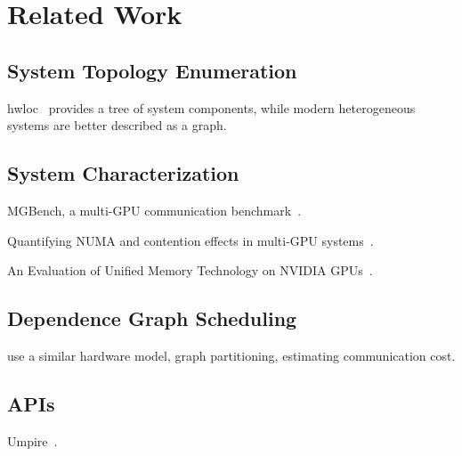 \chapter{Related Work}
\label{ch:related}


\section{System Topology Enumeration}

hwloc~\cite{broquedis2010hwloc} provides a tree of system components, while modern heterogeneous systems are better described as a graph.


\section{System Characterization}

MGBench, a multi-GPU communication benchmark~\cite{bennun2016mgbench}.

Quantifying NUMA and contention effects in multi-GPU systems~\cite{spafford2011quantifying}.

An Evaluation of Unified Memory Technology on NVIDIA GPUs~\cite{li2015evaluation}.

\section{Dependence Graph Scheduling}

\cite{amaral2017topology} use a similar hardware model, graph partitioning, estimating communication cost.

\section{APIs}

Umpire~\cite{beckingsale2018umpire}.

